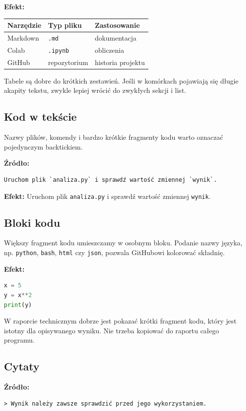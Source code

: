 \documentclass[11pt, a4paper]{article}
\begin{document}
\textbf{Efekt:}
\begin{center}
\begin{tabular}{|l|l|l|}
\hline
\textbf{Narzędzie} & \textbf{Typ pliku} & \textbf{Zastosowanie} \\ \hline
Markdown & \texttt{.md} & dokumentacja \\ \hline
Colab & \texttt{.ipynb} & obliczenia \\ \hline
GitHub & repozytorium & historia projektu \\ \hline
\end{tabular}
\end{center}

Tabele są dobre do krótkich zestawień. Jeśli w komórkach pojawiają się długie akapity tekstu, zwykle lepiej wrócić do zwykłych sekcji i list.

\hrulefill

\subsection{Kod w tekście}
Nazwy plików, komendy i bardzo krótkie fragmenty kodu warto oznaczać pojedynczym backtickiem.

\textbf{Źródło:}
\begin{lstlisting}
Uruchom plik `analiza.py` i sprawdź wartość zmiennej `wynik`.
\end{lstlisting}

\textbf{Efekt:} Uruchom plik \texttt{analiza.py} i sprawdź wartość zmiennej \texttt{wynik}.

\hrulefill

\subsection{Bloki kodu}
Większy fragment kodu umieszczamy w osobnym bloku. Podanie nazwy języka, np. \texttt{python}, \texttt{bash}, \texttt{html} czy \texttt{json}, pozwala GitHubowi kolorować składnię.

\textbf{Efekt:}
\begin{lstlisting}[language=Python]
x = 5
y = x**2
print(y)
\end{lstlisting}

W raporcie technicznym dobrze jest pokazać krótki fragment kodu, który jest istotny dla opisywanego wyniku. Nie trzeba kopiować do raportu całego programu.

\hrulefill

\subsection{Cytaty}
\textbf{Źródło:}
\begin{lstlisting}
> Wynik należy zawsze sprawdzić przed jego wykorzystaniem.
\end{lstlisting}
\end{document}

